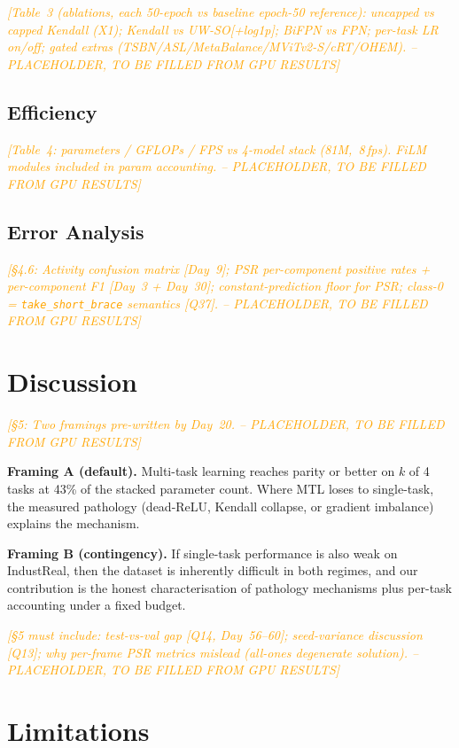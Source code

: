 \documentclass[conference]{IEEEtran}
\newcommand{\resultplaceholder}[1]{\textcolor{orange}{\emph{[#1 -- PLACEHOLDER, TO BE FILLED FROM GPU RESULTS]}}}
\begin{document}
\resultplaceholder{Table~3 (ablations, each 50-epoch vs baseline epoch-50 reference): uncapped vs capped Kendall (X1); Kendall vs UW-SO[+log1p]; BiFPN vs FPN; per-task LR on/off; gated extras (TSBN/ASL/MetaBalance/MViTv2-S/cRT/OHEM).}

\subsection{Efficiency}
\label{sec:efficiency}

\resultplaceholder{Table~4: parameters / GFLOPs / FPS vs 4-model stack (81M,~8\,fps). FiLM modules included in param accounting.}

\subsection{Error Analysis}
\label{sec:error_analysis}

\resultplaceholder{§4.6: Activity confusion matrix [Day~9]; PSR per-component positive rates + per-component F1 [Day~3 + Day~30]; constant-prediction floor for PSR; class-0 = \texttt{take\_short\_brace} semantics [Q37].}

\section{Discussion}
\label{sec:discussion}

\resultplaceholder{§5: Two framings pre-written by Day~20.}

\textbf{Framing A (default).} Multi-task learning reaches parity or better on $k$ of 4 tasks at 43\% of the stacked parameter count. Where MTL loses to single-task, the measured pathology (dead-ReLU, Kendall collapse, or gradient imbalance) explains the mechanism.

\textbf{Framing B (contingency).} If single-task performance is also weak on IndustReal, then the dataset is inherently difficult in both regimes, and our contribution is the honest characterisation of pathology mechanisms plus per-task accounting under a fixed budget.

\resultplaceholder{§5 must include: test-vs-val gap [Q14, Day~56--60]; seed-variance discussion [Q13]; why per-frame PSR metrics mislead (all-ones degenerate solution).}

\section{Limitations}
\label{sec:limitations}
\end{document}
